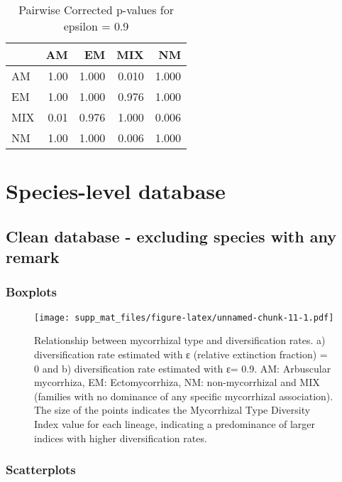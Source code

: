 \documentclass[]{article}
\begin{document}
\begin{table}[H]

\caption{\label{tab:unnamed-chunk-9}Pairwise Corrected p-values for epsilon = 0.9}
\centering
\begin{tabular}{l|r|r|r|r}
\hline
  & AM & EM & MIX & NM\\
\hline
AM & 1.00 & 1.000 & 0.010 & 1.000\\
\hline
EM & 1.00 & 1.000 & 0.976 & 1.000\\
\hline
MIX & 0.01 & 0.976 & 1.000 & 0.006\\
\hline
NM & 1.00 & 1.000 & 0.006 & 1.000\\
\hline
\end{tabular}
\end{table}

\hypertarget{species-level-database}{%
\section{Species-level database}\label{species-level-database}}

\hypertarget{clean-database---excluding-species-with-any-remark}{%
\subsection{Clean database - excluding species with any
remark}\label{clean-database---excluding-species-with-any-remark}}

\hypertarget{boxplots-1}{%
\subsubsection{Boxplots}\label{boxplots-1}}

\begin{figure}
\centering
\texttt{[image: supp\_mat\_files/figure-latex/unnamed-chunk-11-1.pdf]}
\caption{Relationship between mycorrhizal type and diversification
rates. a) diversification rate estimated with ε (relative extinction
fraction) = 0 and b) diversification rate estimated with ε= 0.9. AM:
Arbuscular mycorrhiza, EM: Ectomycorrhiza, NM: non-mycorrhizal and MIX
(families with no dominance of any specific mycorrhizal association).
The size of the points indicates the Mycorrhizal Type Diversity Index
value for each lineage, indicating a predominance of larger indices with
higher diversification rates.}
\end{figure}

\hypertarget{scatterplots-1}{%
\subsubsection{Scatterplots}\label{scatterplots-1}}
\end{document}
